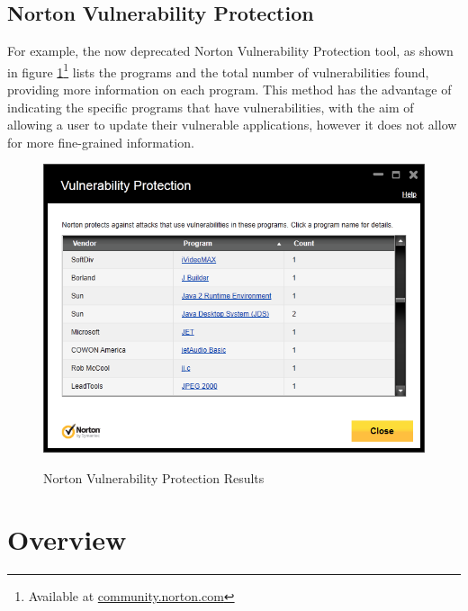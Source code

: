 \subsection{Norton Vulnerability Protection}

For example, the now deprecated Norton Vulnerability Protection tool, as shown in figure \ref{fig:nort}\footnote{Available at \url{community.norton.com}} lists the programs and the total number of  vulnerabilities found, providing more information on each program.  This method has the advantage of indicating the specific programs that have vulnerabilities, with the aim of allowing a user to update their vulnerable applications, however it does not allow for more fine-grained information.


\begin{figure}
\centering 
\includegraphics[width=0.8\linewidth]{norton-cve} 
\label{fig:nort}
\caption{Norton Vulnerability Protection Results}
\end{figure}

\section{Overview}
